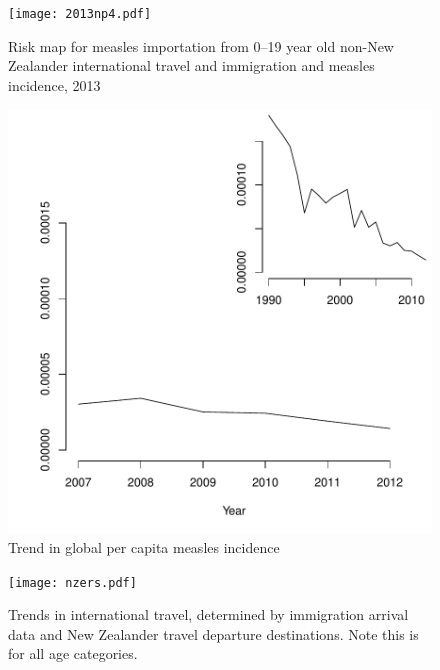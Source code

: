 \documentclass{article}
\begin{document}
\begin{figure}
\begin{center}
     \texttt{[image: 2013np4.pdf]}
\end{center}
\caption{Risk map for measles importation from 0--19 year old non-New Zealander international travel and immigration and measles incidence, 2013}
\label{fig:imrisk12}
\end{figure}

\begin{figure}
\begin{center}
\includegraphics{draftfinalreport_v3-034}
\end{center}
\caption{Trend in global per capita measles incidence}
\label{fig:trendincidence}
\end{figure}

\begin{figure}[H]
     \begin{center}
     \texttt{[image: nzers.pdf]}
     \end{center}
     \caption{Trends in international travel, determined by immigration arrival data and New Zealander travel departure destinations. Note this is for all age categories.}
     \label{fig:travel}
\end{figure}
\end{document}
